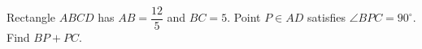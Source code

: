 Rectangle $ABCD$ has $AB=\dfrac{12}{5}$ and $BC=5$. Point $P\in AD$ satisfies $\angle BPC=90^\circ$. Find $BP+PC$.
